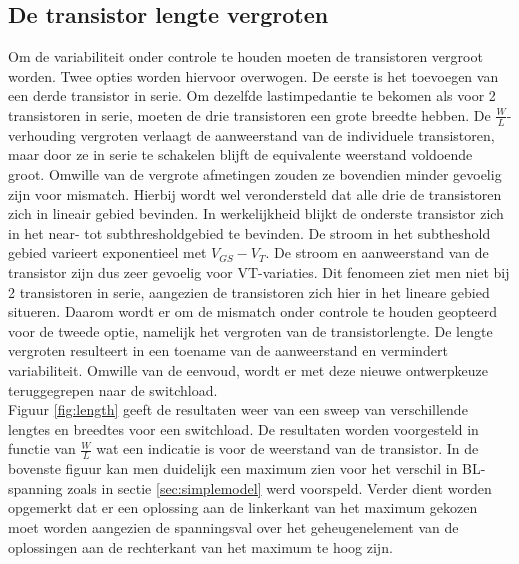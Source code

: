 \subsection{De transistor lengte vergroten}\label{sec:finaleload}
Om de variabiliteit onder controle te houden moeten de transistoren vergroot worden. Twee opties worden hiervoor overwogen. De eerste is het toevoegen van een derde transistor in serie. Om dezelfde lastimpedantie te bekomen als voor 2 transistoren in serie, moeten de drie transistoren een grote breedte hebben. De $\frac{W}{L}$-verhouding vergroten verlaagt de aanweerstand van de individuele transistoren, maar door ze in serie te schakelen blijft de equivalente weerstand voldoende groot. Omwille van de vergrote afmetingen zouden ze bovendien minder gevoelig zijn voor mismatch. Hierbij wordt wel verondersteld dat alle drie de transistoren zich in lineair gebied bevinden. In werkelijkheid blijkt de onderste transistor zich in het near- tot subthresholdgebied te bevinden. De stroom in het subtheshold gebied varieert exponentieel met $V_{GS}-V_{T}$. De stroom en aanweerstand van de transistor zijn dus zeer gevoelig voor VT-variaties. Dit fenomeen ziet men niet bij 2 transistoren in serie, aangezien de transistoren zich hier in het lineare gebied situeren. Daarom wordt er om de mismatch onder controle te houden geopteerd voor de tweede optie, namelijk het vergroten van de transistorlengte. De lengte vergroten resulteert in een toename van de aanweerstand en vermindert variabiliteit. Omwille van de eenvoud, wordt er met deze nieuwe ontwerpkeuze teruggegrepen naar de switchload.\\
Figuur \ref{fig:length} geeft de resultaten weer van een sweep van verschillende lengtes en breedtes voor een switchload. De resultaten worden voorgesteld in functie van $\frac{W}{L}$ wat een indicatie is voor de weerstand van de transistor. In de bovenste figuur kan men duidelijk een maximum zien voor het verschil in BL-spanning zoals in sectie \ref{sec:simplemodel} werd voorspeld. Verder dient worden opgemerkt dat er een oplossing aan de linkerkant van het maximum gekozen moet worden aangezien de spanningsval over het geheugenelement van de oplossingen aan de rechterkant van het maximum te hoog zijn.
